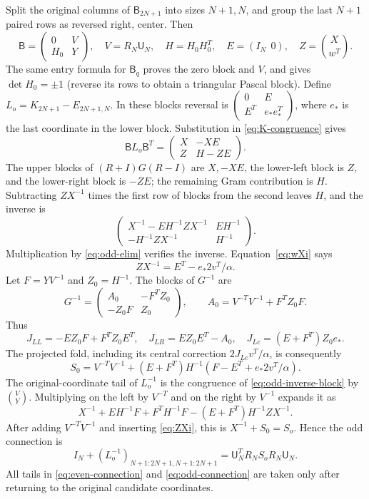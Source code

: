 \documentclass[11pt,a4paper]{amsart}
\theoremstyle{remark}\newtheorem{remark}[theorem]{Remark}
\numberwithin{equation}{section}
\newcommand{\U}{\mathsf U}
\newcommand{\B}{\mathsf B}
\begin{document}
Split the original columns of $\B_{2N+1}$ into sizes $N+1,N$, and group the last $N+1$ paired rows as reversed right, center. Then
\[
 \B=\begin{pmatrix}0&V\\H_0&Y\end{pmatrix},\quad
 V=R_N\U_N,\quad H=H_0H_0^T,\quad E=(I_N\ \ 0),\quad Z=\binom X{w^T}.
\]
The same entry formula for $\B_q$ proves the zero block and $V$, and gives $\det H_0=\pm1$ (reverse its rows to obtain a triangular Pascal block). Define $L_o=K_{2N+1}-E_{2N+1,N}$. In these blocks reversal is $\begin{pmatrix}0&E\\E^T&e_*e_*^T\end{pmatrix}$, where $e_*$ is the last coordinate in the lower block. Substitution in \eqref{eq:K-congruence} gives
\begin{equation}\label{eq:odd-elim}
 \B L_o\B^T=\begin{pmatrix}X&-XE\\Z&H-ZE\end{pmatrix}.
\end{equation}
The upper blocks of $(R+I)G(R-I)$ are $X,-XE$, the lower-left block is $Z$, and the lower-right block is $-ZE$; the remaining Gram contribution is $H$. Subtracting $ZX^{-1}$ times the first row of blocks from the second leaves $H$, and the inverse is
\begin{equation}\label{eq:odd-inverse-block}
 \begin{pmatrix}
 X^{-1}-EH^{-1}ZX^{-1}&EH^{-1}\\
 -H^{-1}ZX^{-1}&H^{-1}
 \end{pmatrix}.
\end{equation}
Multiplication by \eqref{eq:odd-elim} verifies the inverse.
Equation~\eqref{eq:wXi} says
\begin{equation}\label{eq:ZXi}ZX^{-1}=E^T-e_*2v^T/\alpha.\end{equation}
Let $F=YV^{-1}$ and $Z_0=H^{-1}$. The blocks of $G^{-1}$ are
\[
 G^{-1}=\begin{pmatrix}A_0&-F^TZ_0\\-Z_0F&Z_0\end{pmatrix},\qquad
 A_0=V^{-T}V^{-1}+F^TZ_0F.
\]
Thus
\[
 J_{LL}=-EZ_0F+F^TZ_0E^T,\quad J_{LR}=EZ_0E^T-A_0,\quad
 J_{Lc}=(E+F^T)Z_0e_*.
\]
The projected fold, including its central correction $2J_{Lc}v^T/\alpha$, is consequently
\begin{equation}\label{eq:S0}
 S_0=V^{-T}V^{-1}+(E+F^T)H^{-1}(F-E^T+e_*2v^T/\alpha).
\end{equation}
The original-coordinate tail of $L_o^{-1}$ is the congruence of \eqref{eq:odd-inverse-block} by $\binom VY$. Multiplying on the left by $V^{-T}$ and on the right by $V^{-1}$ expands it as
\[
 X^{-1}+EH^{-1}F+F^TH^{-1}F-(E+F^T)H^{-1}ZX^{-1}.
\]
After adding $V^{-T}V^{-1}$ and inserting \eqref{eq:ZXi}, this is $X^{-1}+S_0=S_o$. Hence the odd connection is
\begin{equation}\label{eq:odd-connection}
 I_N+(L_o^{-1})_{N+1:2N+1,N+1:2N+1}=\U_N^TR_NS_oR_N\U_N.
\end{equation}
All tails in \eqref{eq:even-connection} and \eqref{eq:odd-connection} are taken only after returning to the original candidate coordinates.
\end{document}
